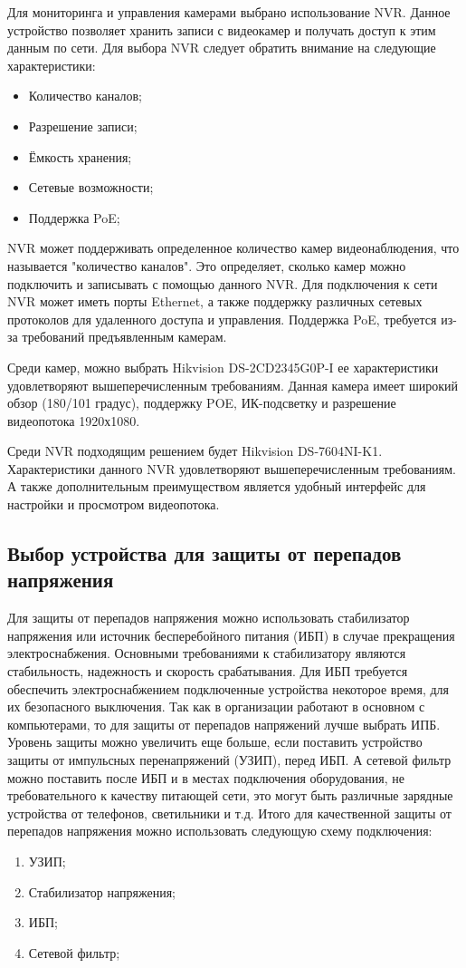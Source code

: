 Для мониторинга и управления камерами выбрано использование NVR. Данное устройство позволяет хранить записи с видеокамер и получать
доступ к этим данным по сети.
Для выбора NVR следует обратить внимание на следующие характеристики:

\begin{itemize}
    \item Количество каналов;
    \item Разрешение записи;
    \item Ёмкость хранения;
    \item Сетевые возможности;
    \item Поддержка PoE;
\end{itemize}

NVR может поддерживать определенное количество камер видеонаблюдения, 
что называется "количество каналов". Это определяет, сколько камер можно подключить и 
записывать с помощью данного NVR. Для подключения к сети NVR может иметь порты Ethernet, а также 
поддержку различных сетевых протоколов для удаленного доступа и управления. Поддержка PoE, требуется 
из-за требований предъявленным камерам. 

Среди камер, можно выбрать Hikvision DS-2CD2345G0P-I ее характеристики удовлетворяют вышеперечисленным требованиям. Данная камера имеет широкий обзор (180/101 градус),
поддержку POE, ИК-подсветку и разрешение видеопотока 1920х1080.

Среди NVR подходящим решением будет Hikvision DS-7604NI-K1. Характеристики данного NVR удовлетворяют вышеперечисленным требованиям. А также дополнительным преимуществом
является удобный интерфейс для настройки и просмотром видеопотока.

\subsection{Выбор устройства для защиты от перепадов напряжения}

Для защиты от перепадов напряжения можно использовать стабилизатор напряжения или источник бесперебойного питания (ИБП) в случае прекращения электроснабжения.
Основными требованиями к стабилизатору являются стабильность, надежность и скорость срабатывания. Для ИБП требуется обеспечить 
электроснабжением подключенные устройства некоторое время, для их безопасного выключения. Так как в организации
работают в основном с компьютерами, то для защиты от перепадов напряжений лучше выбрать ИПБ. Уровень защиты можно увеличить еще больше,
если поставить устройство защиты от импульсных перенапряжений (УЗИП), перед ИБП. А сетевой фильтр можно поставить после 
ИБП и в местах подключения оборудования, не требовательного к качеству питающей сети, это могут быть различные зарядные устройства от телефонов, светильники и т.д.
Итого для качественной защиты от перепадов напряжения можно использовать следующую схему подключения:
\begin{enumerate}
    \item УЗИП;
    \item Стабилизатор напряжения;
    \item ИБП;
    \item Сетевой фильтр;
\end{enumerate}

